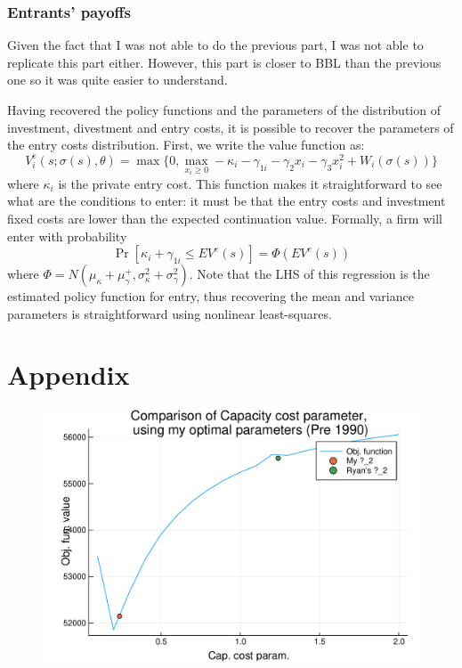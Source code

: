 \documentclass[12pt]{article}
\newcommand{\Prob}[1]{\operatorname{Pr}\left[#1\right]}
\begin{document}
\subsubsection{Entrants' payoffs}

Given the fact that I was not able to do the previous part, I was not able to replicate this part either. However, this part is closer to BBL than the previous one so it was quite easier to understand.

Having recovered the policy functions and the parameters of the distribution of investment, divestment and entry costs, it is possible to recover the parameters of the entry costs distribution. First, we write the value function as: $$V_i^e(s; \sigma(s), \theta) = \max\{0, \max_{x_i\geq 0} -\kappa_i - \gamma_{1i} - \gamma_2x_i - \gamma_3x_i^2 + W_i(\sigma(s))\} $$ where $\kappa_i$ is the private entry cost. This function makes it straightforward to see what are the conditions to enter: it must be that the entry costs and investment fixed costs are lower than the expected continuation value. Formally, a firm will enter with probability $$\Prob{\kappa_i + \gamma_{1i} \leq EV^e(s)} = \Phi\left( EV^e(s)\right) $$ where $\Phi = N(\mu_\kappa + \mu_\gamma^+, \sigma_\kappa^2 + \sigma_\gamma^2)$. Note that the LHS of this regression is the estimated policy function for entry, thus recovering the mean and variance parameters is straightforward using nonlinear least-squares.

\section*{Appendix}

\begin{figure}
\begin{center}
\includegraphics[scale=0.6]{../results/paramcomp-S.pdf} 
\end{center}
\label{fig:d2comp}
\end{figure}
\end{document}
